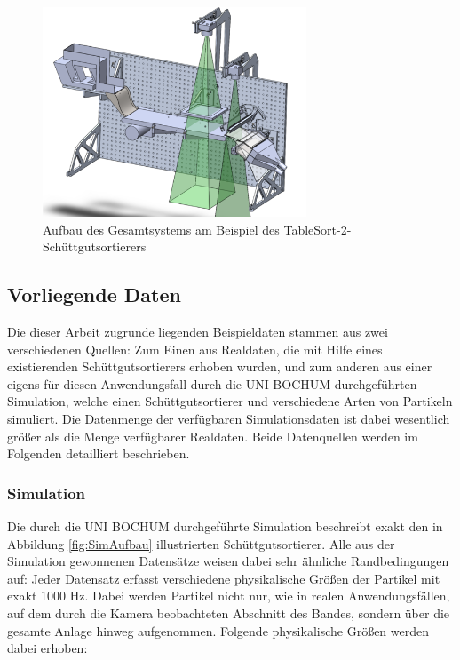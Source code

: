 \begin{figure}[H]
    \centering
    \includegraphics[width=0.7\textwidth]{pics/Anlage1.png}
    \caption{Aufbau des Gesamtsystems am Beispiel des TableSort-2-Schüttgutsortierers \cite{TableSort}}
    \label{fig:SimGesamt}
\end{figure}

\subsection{Vorliegende Daten}
Die dieser Arbeit zugrunde liegenden Beispieldaten stammen aus zwei verschiedenen Quellen: Zum Einen aus Realdaten, die mit Hilfe eines existierenden Schüttgutsortierers erhoben wurden, und zum anderen aus einer eigens für diesen Anwendungsfall durch die UNI BOCHUM durchgeführten Simulation, welche einen Schüttgutsortierer und verschiedene Arten von Partikeln simuliert. Die Datenmenge der verfügbaren Simulationsdaten ist dabei wesentlich größer als die Menge verfügbarer Realdaten. Beide Datenquellen werden im Folgenden detailliert beschrieben. %

\subsubsection{Simulation} \label{DataSimulation}

Die durch die UNI BOCHUM durchgeführte Simulation beschreibt exakt den in Abbildung \ref{fig:SimAufbau} illustrierten Schüttgutsortierer. Alle aus der Simulation gewonnenen Datensätze weisen dabei sehr ähnliche Randbedingungen auf: Jeder Datensatz erfasst verschiedene physikalische Größen der Partikel mit exakt 1000 Hz. Dabei werden Partikel nicht nur, wie in realen Anwendungsfällen, auf dem durch die Kamera beobachteten Abschnitt des Bandes, sondern über die gesamte Anlage hinweg aufgenommen. Folgende physikalische Größen werden dabei erhoben:

